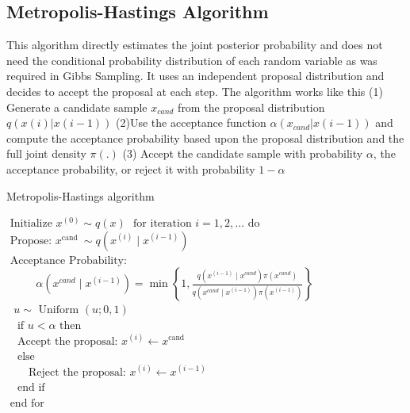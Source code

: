\documentclass[11pt]{article}
\begin{document}
\subsection{Metropolis-Hastings Algorithm \cite{metro}}

This algorithm directly estimates the joint posterior probability and does not need the conditional probability distribution of each random variable as was required in Gibbs Sampling. It uses an independent proposal distribution and decides to accept the proposal at each step. The algorithm works like this 
(1) Generate  a candidate sample \(x_{cand}\) from the proposal distribution $q(x(i) | x(i-1))$ (2)Use the acceptance function $ \alpha( x_{cand} | x(i-1))$ and  compute the acceptance probability based upon the proposal distribution and the full joint density $\pi (.)$ (3) Accept the candidate sample with probability \(\alpha\), the acceptance probability, or reject it with probability $1 - \alpha $

\begin{algorithm}[H]
\caption{Metropolis-Hastings algorithm}
\label{algo:evmcp}
\begin{algorithmic}[1]
\STATE $\text { Initialize } x^{(0)} \sim q(x)$
\STATE $\text { for iteration } i=1,2, \ldots \text { do }$ \\
\STATE $\text {\ \ \ \ Propose: } x^{\text {cand }} \sim q\left(x^{(i)} \mid x^{(i-1)}\right)$ \\
\STATE $\text {\ \ \ \ Acceptance Probability: }$ \\
\STATE $\text{\ \ \ \ }\qquad \alpha\left(x^{c a n d} \mid x^{(i-1)}\right)=\min \left\{1, \frac{q\left(x^{(i-1)} \mid x^{c a n d}\right) \pi\left(x^{c a n d}\right)}{q\left(x^{c a n d} \mid x^{(i-1)}\right) \pi\left(x^{(i-1)}\right)}\right\}$ \\
\STATE $\text{\ \ \ \ }u \sim \text { Uniform }(u ; 0,1)$ \\
\STATE $\text{\ \ \ \ }\text { if } u<\alpha \text { then }$ \\
\STATE $\text{\ \ \ \ }\text { Accept the proposal: } x^{(i)} \leftarrow x^{\text {cand }}$ \\
\STATE $\text{\ \ \ \ }\text { else }$ \\
\STATE $\text{\ \ \ \ }\quad \text { Reject the proposal: } x^{(i)} \leftarrow x^{(i-1)}$ \\
\STATE $\text{\ \ \ \ }\text { end if }$ \\
\STATE $\text { end for }$
\end{algorithmic}
\end{algorithm}
\end{document}
